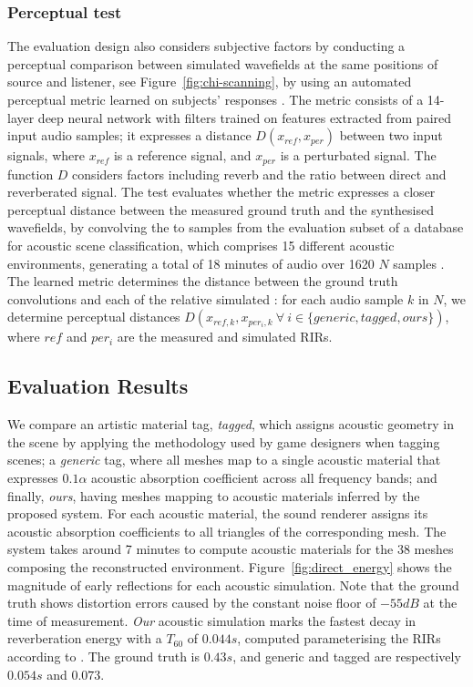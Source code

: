 \subsubsection{Perceptual test}
The evaluation design also considers subjective factors by conducting a perceptual comparison between simulated wavefields at the same positions of source and listener, see Figure~\ref{fig:chi-scanning}, by using an automated perceptual metric learned on subjects’ responses \cite{manocha2020differentiable}. The metric consists of a 14-layer deep neural network with filters trained on features extracted from paired input audio samples; it expresses a distance $D(x_{ref}, x_{per})$ between two input signals, where $x_{ref}$ is a reference signal, and $x_{per}$ is a perturbated signal. The function $D$ considers factors including reverb and the ratio between direct and reverberated signal. The test evaluates whether the metric expresses a closer perceptual distance between the measured ground truth and the synthesised wavefields, by convolving the  to samples from the evaluation subset of a database for acoustic scene classification, which comprises 15 different acoustic environments, generating a total of 18 minutes of audio over 1620 $N$ samples \citep{mesaros2016tut}. The learned metric determines the distance between the ground truth convolutions and each of the relative simulated : for each audio sample $k$ in $N$, we determine perceptual distances $D(x_{ref, k}, x_{per_i, k}~\forall~i \in \{generic, tagged, ours\})$, where $ref$ and $per_i$ are the measured and simulated RIRs.

\subsection{Evaluation Results}
We compare an artistic material tag, \emph{tagged}, which assigns acoustic geometry in the scene by applying the methodology used by game designers when tagging scenes; a \emph{generic} tag, where all meshes map to a single acoustic material that expresses $0.1\alpha$ acoustic absorption coefficient across all frequency bands; and finally, \emph{ours}, having meshes mapping to acoustic materials inferred by the proposed system. For each acoustic material, the sound renderer assigns its acoustic absorption coefficients to all triangles of the corresponding mesh.
The system takes around 7 minutes to compute acoustic materials for the 38 meshes composing the reconstructed environment.
Figure~\ref{fig:direct_energy} shows the magnitude of early reflections for each acoustic simulation. Note that the ground truth shows distortion errors caused by the constant noise floor of $-55dB$ at the time of measurement. \emph{Our} acoustic simulation marks the fastest decay in reverberation energy with a $T_{60}$ of $0.044s$, computed parameterising the RIRs according to \cite{lima_RIR_Parameters}. The ground truth is $0.43s$, and generic and tagged are respectively $0.054s$ and $0.073$.

